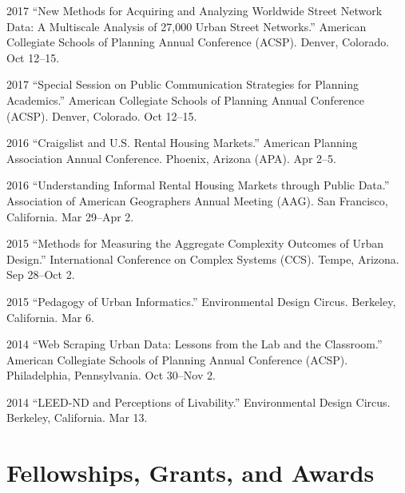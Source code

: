 \documentclass{academiccv}
\begin{document}
\begin{tablist}

\item[2017] \tab \enquote{New Methods for Acquiring and Analyzing Worldwide Street Network Data: A Multiscale Analysis of 27,000 Urban Street Networks.} American Collegiate Schools of Planning Annual Conference (ACSP). Denver, Colorado. Oct 12--15.

\item[2017] \tab \enquote{Special Session on Public Communication Strategies for Planning Academics.} American Collegiate Schools of Planning Annual Conference (ACSP). Denver, Colorado. Oct 12--15.

\item[2016] \tab \enquote{Craigslist and U.S. Rental Housing Markets.} American Planning Association Annual Conference. Phoenix, Arizona (APA). Apr 2--5.

\item[2016] \tab \enquote{Understanding Informal Rental Housing Markets through Public Data.} Association of American Geographers Annual Meeting (AAG). San Francisco, California. Mar 29--Apr 2.

\item[2015] \tab \enquote{Methods for Measuring the Aggregate Complexity Outcomes of Urban Design.} International Conference on Complex Systems (CCS). Tempe, Arizona. Sep 28--Oct 2.

\item[2015] \tab \enquote{Pedagogy of Urban Informatics.} Environmental Design Circus. Berkeley, California. Mar 6.

\item[2014] \tab \enquote{Web Scraping Urban Data: Lessons from the Lab and the Classroom.} American Collegiate Schools of Planning Annual Conference (ACSP). Philadelphia, Pennsylvania. Oct 30--Nov 2.

\item[2014] \tab \enquote{LEED-ND and Perceptions of Livability.} Environmental Design Circus. Berkeley, California. Mar 13.

\end{tablist}



\section*{Fellowships, Grants, and Awards}
\end{document}
